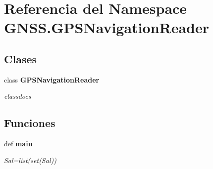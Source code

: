 \section{Referencia del Namespace G\-N\-S\-S.\-G\-P\-S\-Navigation\-Reader}
\label{namespaceGNSS_1_1GPSNavigationReader}
\subsection*{Clases}
\begin{DoxyCompactItemize}
\item 
class {\bf G\-P\-S\-Navigation\-Reader}
\begin{DoxyCompactList}\small\item\em classdocs \end{DoxyCompactList}\end{DoxyCompactItemize}
\subsection*{Funciones}
\begin{DoxyCompactItemize}
\item 
def {\bf main}
\begin{DoxyCompactList}\small\item\em Sal=list(set(\-Sal)) \end{DoxyCompactList}\end{DoxyCompactItemize}
